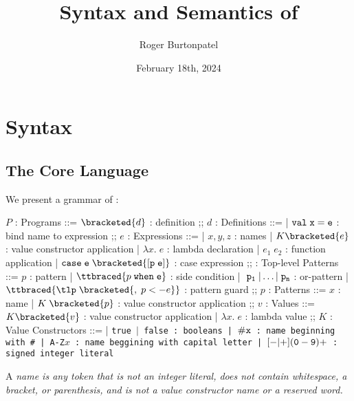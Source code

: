 \documentclass[]{article}
\title{Syntax and Semantics of \PPlus}
\author{Roger Burtonpatel}
\date{February 18th, 2024}
\begin{document}
\maketitle

\section{Syntax}

\subsection{The Core Language}

We present a grammar of \PPlus: 

\bigskip

\begin{center}
    \begin{bnf}
    $P$ : \textsf{Programs} ::=
    $\bracketed{d}$ : definition
    ;;
    $d$ : \textsf{Definitions} ::=
    | $\tt{val} \; x \; \tt{=} \; e$ : bind name to expression
    ;;
    $e$ : Expressions ::= 
    | $x, y, z$ : names
    | $K\bracketed{e}$ : value constructor application 
    | $\lambda x. \; e$ : lambda declaration  
    | $e_{1} \; e_{2}$ : function application 
    | $\tt{case} \; e \; \bracketed{\tt{[} p \; e \tt{]}}$ : case expression 
    ;;
    \tlp : \textsf{Top-level Patterns} ::= $p$ : pattern 
    | $\ttbraced{p \; \tt{when} \; e }$ : side condition
    | $\tt \; p_{1} \; \vert \dots \vert \; p_{n}$ : or-pattern 
    | $\ttbraced{\tlp \; \bracketed{, \; p <- e}}$ : pattern guard
    ;;
    $p$ : \textsf{Patterns} ::= $x$ : name 
    | $K \; \bracketed{p}$ : value constructor application 
    ;;
    $v$ : Values ::= $K\bracketed{v}$ : value constructor application 
    | $\lambda x. \; e$ : lambda value 
    ;;
    $K$ : \textsf{Value Constructors} ::=
    | \tt{true} $\vert$ \tt{false} : booleans
    | $\tt{\#}x$ : name beginning with \tt{\#}
    | \tt{A-Z}$x$ : name beggining with capital letter
    | $[\tt{-}\vert\tt{+}](\tt{0}-\tt{9})+$ : signed integer literal 
    \end{bnf}
\end{center}


A \it{name} is any token that is not an integer literal, 
does not contain whitespace, a bracket, or parenthesis, 
and is not a value constructor name or a reserved word.
\end{document}
